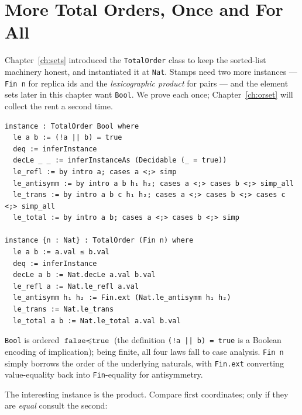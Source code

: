 \documentclass[12pt, a4paper, openright]{book}
\theoremstyle{thmstyle}
\theoremstyle{defstyle}
\newcommand{\lc}[1]{\texttt{#1}}
\newcommand{\lean}[1]{\texttt{#1}}
\begin{document}
\section{More Total Orders, Once and For All}
\label{sec:totalorder-instances}

Chapter~\ref{ch:sets} introduced the \lc{TotalOrder} class to keep the
sorted-list machinery honest, and instantiated it at \lc{Nat}. Stamps
need two more instances --- \lc{Fin n} for replica ids and the
\emph{lexicographic product} for pairs --- and the element sets later in
this chapter want \lc{Bool}. We prove each once; Chapter~\ref{ch:orset}
will collect the rent a second time.

\begin{verbatim}
instance : TotalOrder Bool where
  le a b := (!a || b) = true
  deq := inferInstance
  decLe _ _ := inferInstanceAs (Decidable (_ = true))
  le_refl := by intro a; cases a <;> simp
  le_antisymm := by intro a b h₁ h₂; cases a <;> cases b <;> simp_all
  le_trans := by intro a b c h₁ h₂; cases a <;> cases b <;> cases c <;> simp_all
  le_total := by intro a b; cases a <;> cases b <;> simp

instance {n : Nat} : TotalOrder (Fin n) where
  le a b := a.val ≤ b.val
  deq := inferInstance
  decLe a b := Nat.decLe a.val b.val
  le_refl a := Nat.le_refl a.val
  le_antisymm h₁ h₂ := Fin.ext (Nat.le_antisymm h₁ h₂)
  le_trans := Nat.le_trans
  le_total a b := Nat.le_total a.val b.val
\end{verbatim}

\lc{Bool} is ordered $\lean{false} \preccurlyeq \lean{true}$ (the definition
\lc{(!a || b) = true} is a Boolean encoding of implication); being
finite, all four laws fall to case analysis. \lc{Fin n} simply borrows
the order of the underlying naturals, with \lc{Fin.ext} converting
value-equality back into \lc{Fin}-equality for antisymmetry.

The interesting instance is the product. Compare first coordinates; only
if they are \emph{equal} consult the second:
\end{document}
